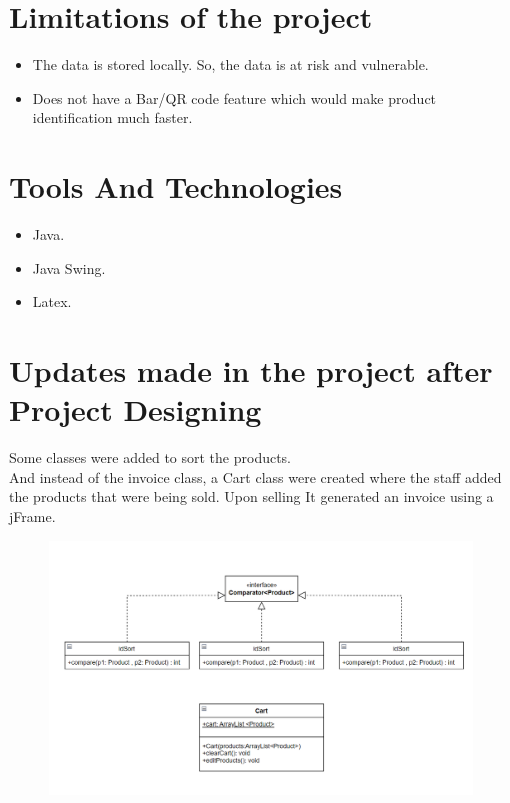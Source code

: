 \documentclass{article}
\begin{document}
{}
\section*{\LARGE Limitations of the project}
\large 
\begin{itemize}
    \item \large The data is stored locally. So, the data is at risk and vulnerable. 
    \item \large Does not have a Bar/QR code feature which would make product identification much faster.
\end{itemize}

{}
\section*{\LARGE Tools And Technologies}
\large 
\begin{itemize}
    \item \large Java.
    \item \large Java Swing.
    \item \large Latex.
\end{itemize}
\pagebreak

{}
\section*{\LARGE Updates made in the project after Project Designing}
Some classes were added to sort the products.\\
And instead of the invoice class, a Cart class were created where the staff added the products that were being sold. Upon selling It generated an invoice using a jFrame. 

  \begin{figure}[htp]
 \centering
\includegraphics[scale=.45]{Capture.PNG}  
\end{figure}
\end{document}
